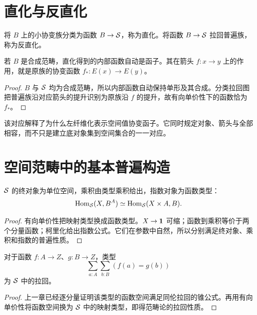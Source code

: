 \section{直化与反直化}
\begin{definition}
将 $B$ 上的小协变族分类为函数 $B\to\mathcal S$，称为直化。将函数 $B\to\mathcal S$ 拉回普遍族，称为反直化。
\end{definition}
\begin{proposition}
若 $B$ 是合成范畴，直化得到的内部函数自动是函子。其在箭头 $f:x\to y$ 上的作用，就是原族的协变函数 $f_*:E(x)\to E(y)$。
\end{proposition}
\begin{proof}
$B$ 与 $\mathcal S$ 均为合成范畴，所以内部函数自动保持单形及其合成。分类拉回图把普遍族沿对应箭头的提升识别为原族沿 $f$ 的提升，故有向单价性下的函数恰为 $f_*$。
\end{proof}
\begin{remark}
该对应解释了为什么左纤维化表示空间值协变函子。它同时规定对象、箭头与全部相容，而不只是建立底对象集到空间集合的一一对应。
\end{remark}

\section{空间范畴中的基本普遍构造}
\begin{proposition}
$\mathcal S$ 的终对象为单位空间，乘积由类型乘积给出，指数对象为函数类型：
\[
\operatorname{Hom}_\mathcal S(X,B^A)\simeq\operatorname{Hom}_\mathcal S(X\times A,B).
\]
\end{proposition}
\begin{proof}
有向单价性把映射类型换成函数类型。$X\to\mathbf 1$ 可缩；函数到乘积等价于两个分量函数；柯里化给出指数公式。它们在参数中自然，所以分别满足终对象、乘积和指数的普遍性质。
\end{proof}
\begin{proposition}[空间中的同伦拉回]
对于函数 $f:A\to Z$、$g:B\to Z$，类型
\[
\sum_{a:A}\sum_{b:B}(f(a)=g(b))
\]
为 $\mathcal S$ 中的拉回。
\end{proposition}
\begin{proof}
上一章已经逐分量证明该类型的函数空间满足同伦拉回的锥公式。再用有向单价性将函数空间换为 $\mathcal S$ 中的映射类型，即得范畴论的拉回性质。
\end{proof}
